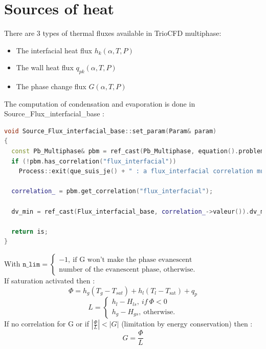 \section{Sources of heat}
There are 3 types of thermal fluxes available in TrioCFD multiphase:
\begin{itemize}
    \item[\small \textcolor{blue}{\ding{109}}] The interfacial heat flux $h_k(\alpha,T,P)$
    \item[\small \textcolor{blue}{\ding{109}}] The wall heat flux $q_{pk}(\alpha,T,P)$
    \item[\small \textcolor{blue}{\ding{109}}]  The phase change flux $G(\alpha,T,P)$
\end{itemize}
The computation of condensation and evaporation is done in Source_Flux_interfacial_base :
\begin{lstlisting}[language=c++]
void Source_Flux_interfacial_base::set_param(Param& param)
{
  const Pb_Multiphase& pbm = ref_cast(Pb_Multiphase, equation().probleme());
  if (!pbm.has_correlation("flux_interfacial"))
    Process::exit(que_suis_je() + " : a flux_interfacial correlation must be defined in the global correlations { } block!");

  correlation_ = pbm.get_correlation("flux_interfacial");

  dv_min = ref_cast(Flux_interfacial_base, correlation_->valeur()).dv_min();

  return is;
}
\end{lstlisting}
With $\texttt{n\_lim}=\begin{cases} -1,\ \text{if G won't make the phase evanescent}\\ \text{number of the evanescent phase, otherwise.}
\end{cases}$\\
If saturation activated then :
\begin{equation}
    \Phi=h_g(T_g-T_{sat})+h_l(T_l-T_{\text{sat}})+q_p
\end{equation}
\begin{equation}
    L=\begin{cases} h_l-H_{ls},\ if\ \Phi<0\\ h_g-H_{gs},\ \text{otherwise}.  \end{cases}
\end{equation}
If no correlation for G or if $|\frac{\Phi}{L}|<|G|$ (limitation by energy conservation) then : 
\begin{equation}
   G=\frac{\Phi}{L}
\end{equation}
